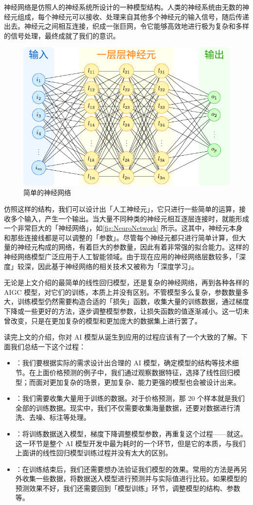 神经网络是仿照人的神经系统所设计的一种模型结构。人类的神经系统由无数的神经元组成，每个神经元可以接收、处理来自其他多个神经元的输入信号，随后传递出去。神经元之间相互连接，织成一张巨网，令它能够高效地进行极为复杂和多样的信号处理，最终成就了我们的意识。

\begin{figure}[htb!]
  \centering
  \includegraphics[width=.5\textwidth]{assets/surpass/NeuroNetwork.pdf}
  \caption{简单的神经网络}
  \label{fig:NeuroNetwork}
\end{figure}

仿照这样的结构，我们可以设计出「人工神经元」，它只进行一些简单的运算，接收多个输入，产生一个输出。当大量不同种类的神经元相互逐层连接时，就能形成一个非常巨大的「神经网络」，如\autoref{fig:NeuroNetwork} 所示。这其中，神经元本身和那些连接线都是可以调整的「参数」。尽管每个神经元都只进行简单计算，但大量的神经元构成的网络，有着巨大的参数量，因此有着非常强的拟合能力。这样的神经网络模型广泛应用于人工智能领域。由于现在应用的神经网络层数较多，「深度」较深，因此基于神经网络的相关技术又被称为「深度学习」。

无论是上文介绍的最简单的线性回归模型，还是复杂的神经网络，再到各种各样的 AIGC 模型，对它们的训练，本质上并没有区别。不管模型多么复杂，参数数量多大，训练模型仍然需要构造合适的「损失」函数，收集大量的训练数据，通过梯度下降或一些更好的方法，逐步调整模型参数，让损失函数的值逐渐减小。这一切未曾改变，只是在更加复杂的模型和更加庞大的数据集上进行罢了。

读完上文的介绍，你对 AI 模型从诞生到应用的过程应该有了一个大致的了解。下面我们总结一下这个过程：

\begin{itemize}
  \item {}：我们要根据实际的需求设计出合理的 AI 模型，确定模型的结构等技术细节。在上面价格预测的例子中，我们通过观察数据特征，选择了线性回归模型；而面对更加复杂的场景，更加复杂、能力更强的模型也会被设计出来。
  \item {}：我们需要收集大量用于训练的数据。对于价格预测，那 20 个样本就是我们全部的训练数据。现实中，我们不仅需要收集海量数据，还要对数据进行清洗、去噪、标注等处理。
  \item {}：将训练数据送入模型，梯度下降调整模型参数，再重复这个过程——就这。这一环节是整个 AI 模型开发中最为耗时的一个环节，但是它的本质，与我们上面讲的线性回归模型训练过程并没有太大的区别。
  \item {}：在训练结束后，我们还需要想办法验证我们模型的效果。常用的方法是再另外收集一些数据，将数据送入模型进行预测并与实际值进行比较。如果模型的预测效果不好，我们还需要回到「模型训练」环节，调整模型的结构、参数等。
\end{itemize}

